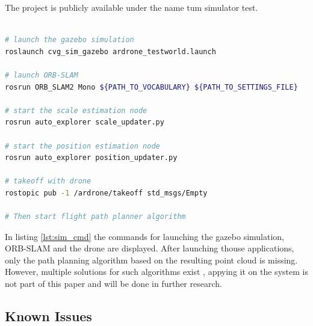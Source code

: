 	The project is publicly available under the name tum simulator test.
	
	\begin{lstlisting}[language=bash, caption=Launching the simulated environment, label=lst:sim_cmd]
	
# launch the gazebo simulation
roslaunch cvg_sim_gazebo ardrone_testworld.launch
	
# launch ORB-SLAM
rosrun ORB_SLAM2 Mono ${PATH_TO_VOCABULARY} ${PATH_TO_SETTINGS_FILE}

# start the scale estimation node
rosrun auto_explorer scale_updater.py

# start the position estimation node
rosrun auto_explorer position_updater.py
	
# takeoff with drone 
rostopic pub -1 /ardrone/takeoff std_msgs/Empty

# Then start flight path planner algorithm

	\end{lstlisting}
	
	In listing \ref{lst:sim_cmd} the commands for launching the gazebo simulation, ORB-SLAM and the drone are displayed. After launching thouse 
	applications, only the path planning algorithm based on the resulting point cloud is missing. However, multiple solutions for such algorithms 
	exist \cite{path}, appying it on the system is not part of this paper and will be done in further research. 

	\subsection{Known Issues}
	
